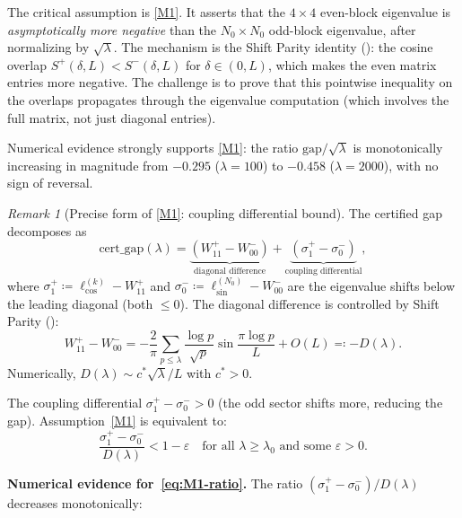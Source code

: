 \documentclass[12pt,a4paper]{article}
\theoremstyle{definition}
\theoremstyle{remark}
\newtheorem{remark}[theorem]{Remark}
\begin{document}
\noindent The critical assumption is \ref{M1}. It asserts that the $4 \times 4$ even-block eigenvalue is \emph{asymptotically more negative} than the $N_0 \times N_0$ odd-block eigenvalue, after normalizing by $\sqrt{\lambda}$. The mechanism is the Shift Parity identity (): the cosine overlap $S^+(\delta, L) < S^-(\delta, L)$ for $\delta \in (0, L)$, which makes the even matrix entries more negative. The challenge is to prove that this pointwise inequality on the overlaps propagates through the eigenvalue computation (which involves the full matrix, not just diagonal entries).

Numerical evidence strongly supports \ref{M1}: the ratio $\mathrm{gap}/\sqrt{\lambda}$ is monotonically increasing in magnitude from $-0.295$ ($\lambda = 100$) to $-0.458$ ($\lambda = 2000$), with no sign of reversal.

\begin{remark}[Precise form of \ref{M1}: coupling differential bound]
\label{rem:M1-precise}
The certified gap decomposes as
\begin{equation}
\label{eq:gap-decomp}
  \mathrm{cert\_gap}(\lambda) = \underbrace{(W_{11}^+ - W_{00}^-)}_{\text{diagonal difference}} + \underbrace{(\sigma^+_1 - \sigma^-_0)}_{\text{coupling differential}},
\end{equation}
where $\sigma^+_1 \coloneqq \ell_{\cos}^{(k)} - W_{11}^+$ and $\sigma^-_0 \coloneqq \ell_{\sin}^{(N_0)} - W_{00}^-$ are the eigenvalue shifts below the leading diagonal (both $\leq 0$). The diagonal difference is controlled by Shift Parity ():
\[
  W_{11}^+ - W_{00}^- = -\frac{2}{\pi}\sum_{p \leq \lambda}\frac{\log p}{\sqrt{p}}\sin\frac{\pi\log p}{L} + O(L) \eqqcolon -D(\lambda).
\]
Numerically, $D(\lambda) \sim c^*\sqrt{\lambda}/L$ with $c^* > 0$.

The coupling differential $\sigma^+_1 - \sigma^-_0 > 0$ (the odd sector shifts more, reducing the gap). Assumption~\ref{M1} is equivalent to:
\begin{equation}
\label{eq:M1-ratio}
  \frac{\sigma^+_1 - \sigma^-_0}{D(\lambda)} < 1 - \varepsilon \quad\text{for all } \lambda \geq \lambda_0 \text{ and some } \varepsilon > 0.
\end{equation}
\end{remark}

\noindent\textbf{Numerical evidence for~\eqref{eq:M1-ratio}.} The ratio $(\sigma^+_1 - \sigma^-_0)/D(\lambda)$ decreases monotonically:
\end{document}

